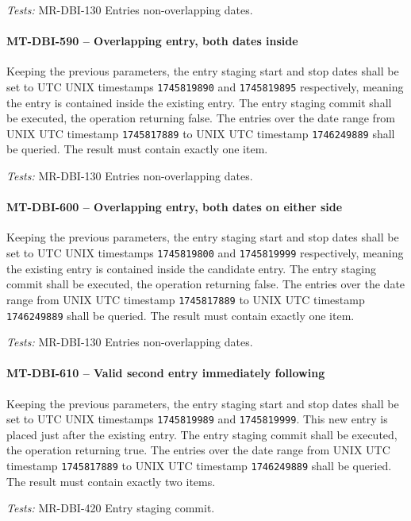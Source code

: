 \textit{Tests: } MR-DBI-130 Entries non-overlapping dates.

\paragraph{MT-DBI-590 -- Overlapping entry, both dates inside}
Keeping the previous parameters, the entry staging start and stop dates shall be
set to UTC UNIX timestamps \lstinline{1745819890} and \lstinline{1745819895}
respectively, meaning the entry is contained inside the existing entry. The
entry staging commit shall be executed, the operation returning false. The
entries over the date range from UNIX UTC timestamp \lstinline{1745817889} to
UNIX UTC timestamp \lstinline{1746249889} shall be queried. The result must
contain exactly one item.

\textit{Tests: } MR-DBI-130 Entries non-overlapping dates.

\paragraph{MT-DBI-600 -- Overlapping entry, both dates on either side}
Keeping the previous parameters, the entry staging start and stop dates shall be
set to UTC UNIX timestamps \lstinline{1745819800} and \lstinline{1745819999}
respectively, meaning the existing entry is contained inside the candidate
entry. The entry staging commit shall be executed, the operation returning
false. The entries over the date range from UNIX UTC timestamp
\lstinline{1745817889} to UNIX UTC timestamp \lstinline{1746249889}
shall be queried. The result must contain exactly one item.

\textit{Tests: } MR-DBI-130 Entries non-overlapping dates.

\paragraph{MT-DBI-610 -- Valid second entry immediately following}
Keeping the previous parameters, the entry staging start and stop dates
shall be set to UTC UNIX timestamps \lstinline{1745819989} and
\lstinline{1745819999}. This new entry is placed just after the existing entry.
The entry staging commit shall be executed, the operation returning true.
The entries over the date range from UNIX UTC timestamp
\lstinline{1745817889} to UNIX UTC timestamp \lstinline{1746249889}
shall be queried. The result must contain exactly two items.

\textit{Tests: } MR-DBI-420 Entry staging commit.

